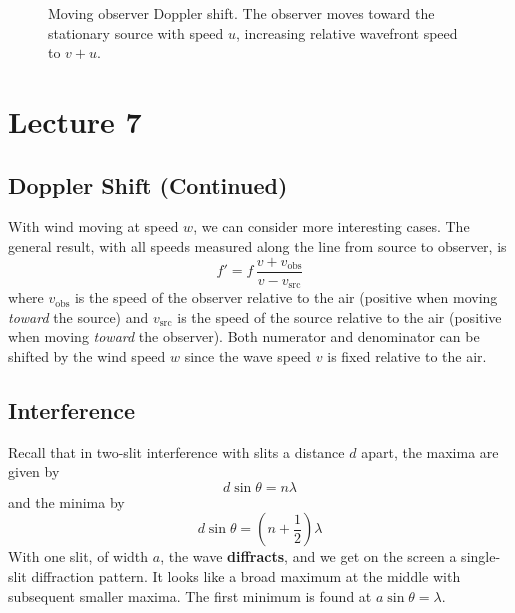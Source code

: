 \documentclass{report}
\numberwithin{equation}{section}
\begin{document}
\begin{figure}[H]
\centering
{}
\caption{Moving observer Doppler shift. The observer moves toward the
stationary source with speed $u$, increasing relative wavefront speed to $v+u$.}
\label{fig:doppler_observer}
\end{figure}
\section{Lecture 7}
\subsection{Doppler Shift (Continued)}
With wind moving at speed $w$, we can consider more interesting cases. The general result, with all speeds measured along the line from source to observer, is
\begin{equation}
	f' = f\,\frac{v + v_{\text{obs}}}{v - v_{\text{src}}}
\end{equation}
where $v_{\text{obs}}$ is the speed of the observer relative to the air (positive when moving \emph{toward} the source) and $v_{\text{src}}$ is the speed of the source relative to the air (positive when moving \emph{toward} the observer). Both numerator and denominator can be shifted by the wind speed $w$ since the wave speed $v$ is fixed relative to the air.
\subsection{Interference}
Recall that in two-slit interference with slits a distance $d$ apart, the maxima are given by
\begin{equation}
	d\sin\theta = n\lambda
\end{equation}
and the minima by
\begin{equation}
	d\sin\theta = \left(n+\frac{1}{2}\right)\lambda
\end{equation}
With one slit, of width $a$, the wave \textbf{diffracts}, and we get on the screen a single-slit diffraction pattern. It looks like a broad maximum at the middle with subsequent smaller maxima. The first minimum is found at $a\sin\theta = \lambda$.
\end{document}
